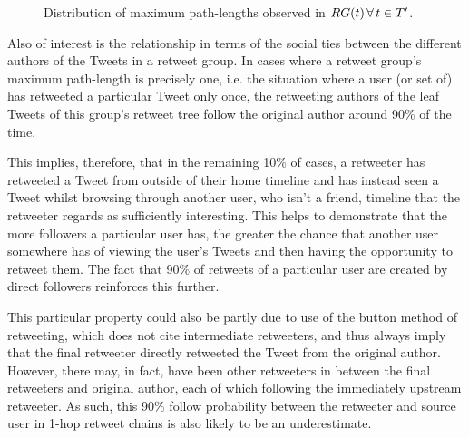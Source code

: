 \begin{figure}[h]
\centering
    \caption{Distribution of maximum path-lengths observed in $RG(t) \, \forall \, t \in T'$.}
    \label{fig:pathlength-distribution}
\end{figure}

Also of interest is the relationship in terms of the social ties between the different authors of the Tweets in a retweet group. In cases where a retweet group's maximum path-length is precisely one, i.e. the situation where a user (or set of) has retweeted a particular Tweet only once, the retweeting authors of the leaf Tweets of this group's retweet tree follow the original author around 90\% of the time.

This implies, therefore, that in the remaining 10\% of cases, a retweeter has retweeted a Tweet from outside of their home timeline and has instead seen a Tweet whilst browsing through another user, who isn't a friend, timeline that the retweeter regards as sufficiently interesting. This helps to demonstrate that the more followers a particular user has, the greater the chance that another user somewhere has of viewing the user's Tweets and then having the opportunity to retweet them. The fact that 90\% of retweets of a particular user are created by direct followers reinforces this further.

This particular property could also be partly due to use of the button method of retweeting, which does not cite intermediate retweeters, and thus always imply that the final retweeter directly retweeted the Tweet from the original author. However, there may, in fact, have been other retweeters in between the final retweeters and original author, each of which following the immediately upstream retweeter. As such, this 90\% follow probability between the retweeter and source user in 1-hop retweet chains is also likely to be an underestimate.

